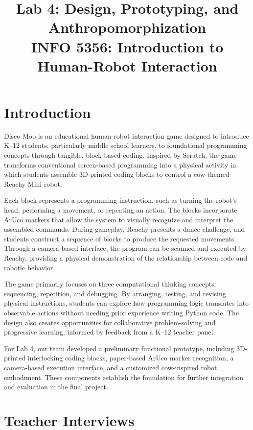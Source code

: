 \documentclass[conference]{IEEEtran}
\title{Lab 4: Design, Prototyping, and Anthropomorphization\\
\large INFO 5356: Introduction to Human-Robot Interaction}
\author{
\IEEEauthorblockN{\fillin{Elliot Zhang, Yifan (Fanning) Luo, Jaclyn Pham, Jiaxin (Aurora) Shen}}
\IEEEauthorblockA{Cornell Tech\\
\{\fillin{qz432, yl4389, cqp4, js3996}\}@cornell.edu}
}
\begin{document}
\maketitle


\section{Introduction}

Disco Moo is an educational human-robot interaction game designed to introduce K--12 students, particularly middle school learners, to foundational programming concepts through tangible, block-based coding. Inspired by Scratch, the game transforms conventional screen-based programming into a physical activity in which students assemble 3D-printed coding blocks to control a cow-themed Reachy Mini robot.

Each block represents a programming instruction, such as turning the robot's head, performing a movement, or repeating an action. The blocks incorporate ArUco markers that allow the system to visually recognize and interpret the assembled commands. During gameplay, Reachy presents a dance challenge, and students construct a sequence of blocks to produce the requested movements. Through a camera-based interface, the program can be scanned and executed by Reachy, providing a physical demonstration of the relationship between code and robotic behavior.

The game primarily focuses on three computational thinking concepts: sequencing, repetition, and debugging. By arranging, testing, and revising physical instructions, students can explore how programming logic translates into observable actions without needing prior experience writing Python code. The design also creates opportunities for collaborative problem-solving and progressive learning, informed by feedback from a K--12 teacher panel.

For Lab 4, our team developed a preliminary functional prototype, including 3D-printed interlocking coding blocks, paper-based ArUco marker recognition, a camera-based execution interface, and a customized cow-inspired robot embodiment. These components establish the foundation for further integration and evaluation in the final project.



\section{Teacher Interviews}
\end{document}
